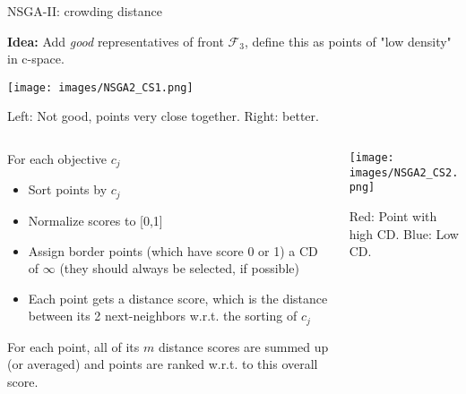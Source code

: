 \begin{frame}[allowframebreaks]{NSGA-II: crowding distance}

\textbf{Idea:} Add \textit{good} representatives of front $\mathcal{F}_3$, define this as points of "low density" in c-space.

\begin{center}
\texttt{[image: images/NSGA2\_CS1.png]}
\end{center}

Left: Not good, points very close together. Right: better.

\framebreak


\begin{columns}
\begin{column}{0.5\textwidth}
For each objective $c_j$
\begin{itemize}
\item Sort points by $c_j$
\item Normalize scores to [0,1]
\item Assign border points (which have score 0 or 1) a CD of $\infty$ (they should always be selected, if possible)
\item Each point gets a distance score, which is the distance between its 2 next-neighbors w.r.t. the sorting of $c_j$
\end{itemize}
For each point, all of its $m$ distance scores are summed up (or averaged) and points are ranked w.r.t. to this overall score.
\end{column}

\begin{column}{0.5\textwidth}
\begin{center}
\texttt{[image: images/NSGA2\_CS2.png]}

\begin{footnotesize}
Red: Point with high CD. Blue: Low CD.
\end{footnotesize}
\end{center}
\end{column}
\end{columns}


\framebreak



\end{frame}
